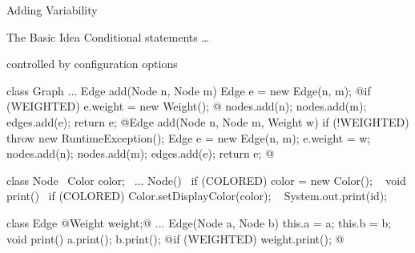 \begin{frame}[fragile]{Adding Variability}
	\small
	\begin{mycolumns}[b,widths={53},height=70mm]
		{\normalsize \begin{definition}{The Basic Idea}
			Conditional statements \ldots

			controlled by configuration options
		\end{definition}}
\begin{codetight}{}
class Graph {
	...
	Edge add(Node n, Node m) {
		Edge e = new Edge(n, m);
		@if (WEIGHTED) { e.weight = new Weight(); }@
		nodes.add(n); nodes.add(m); edges.add(e);
		return e;
	}
	@Edge add(Node n, Node m, Weight w) {
		if (!WEIGHTED) { throw new RuntimeException(); }
		Edge e = new Edge(n, m);
		e.weight = w;
		nodes.add(n); nodes.add(m); edges.add(e);
		return e;
	}@
}
\end{codetight}
	\mynextcolumn
\begin{codetight}{}
class Node {
	~Color color;~
	...
	Node() {
		~if (COLORED) { color = new Color(); }~
	}
	void print() {
		~if (COLORED) { Color.setDisplayColor(color); }~
		System.out.print(id);
	}
}
\end{codetight}
\begin{codetight}{}
class Edge {
	@Weight weight;@
	...
	Edge(Node a, Node b) {
		this.a = a; this.b = b;
	}
	void print() {
		a.print(); b.print();
		@if (WEIGHTED) { weight.print(); }@
	}
}
\end{codetight}
	\end{mycolumns}
\end{frame}

